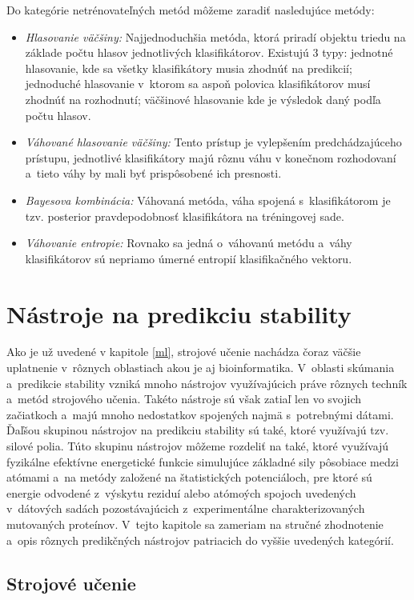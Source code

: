 Do kategórie netrénovateľných metód môžeme zaradiť nasledujúce metódy:
\begin{itemize}
	\item \textit{Hlasovanie väčšiny:} Najjednoduchšia metóda, ktorá priradí objektu triedu na základe počtu hlasov jednotlivých klasifikátorov. Existujú 3 typy: jednotné hlasovanie, kde sa všetky klasifikátory musia zhodnúť na predikcií; jednoduché hlasovanie v~ktorom sa aspoň polovica klasifikátorov musí zhodnúť na rozhodnutí; väčšinové hlasovanie kde je výsledok daný podľa počtu hlasov.
	\item \textit{Váhované hlasovanie väčšiny:} Tento prístup je vylepšením predchádzajúceho prístupu, jednotlivé klasifikátory majú rôznu váhu v konečnom rozhodovaní a~tieto váhy by mali byť prispôsobené ich presnosti.
	\item \textit{Bayesova kombinácia:} Váhovaná metóda, váha spojená s~klasifikátorom je tzv. posterior pravdepodobnosť klasifikátora na tréningovej sade.
	\item \textit{Váhovanie entropie:} Rovnako sa jedná o~váhovanú metódu a~váhy klasifikátorov sú nepriamo úmerné entropií klasifikačného vektoru.
\end{itemize}


\chapter{Nástroje na predikciu stability}

Ako je už uvedené v kapitole \ref{ml}, strojové učenie nachádza čoraz väčšie uplatnenie v~rôznych oblastiach akou je aj bioinformatika. V~oblasti skúmania a~predikcie stability vzniká mnoho nástrojov využívajúcich práve rôznych techník a~metód strojového učenia. Takéto nástroje sú však zatiaľ len vo svojich začiatkoch a~majú mnoho nedostatkov spojených najmä s~potrebnými dátami. Ďaľšou skupinou nástrojov na predikciu stability sú také, ktoré využívajú tzv. silové polia. Túto skupinu nástrojov môžeme rozdeliť na také, ktoré využívajú fyzikálne efektívne energetické funkcie simulujúce základné sily pôsobiace medzi atómami a~na metódy založené na štatistických potenciáloch, pre ktoré sú energie odvodené z~výskytu reziduí alebo atómoých spojoch uvedených v~dátových sadách pozostávajúcich z~experimentálne charakterizovaných mutovaných proteínov.
V~tejto kapitole sa zameriam na stručné zhodnotenie a~opis rôznych predikčných nástrojov patriacich do vyššie uvedených kategórií.

\section{Strojové učenie}

